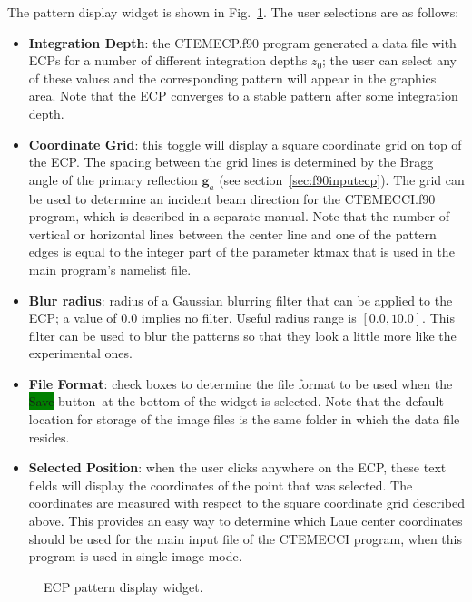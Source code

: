 \documentclass[DIV=calc, paper=letter, fontsize=11pt]{scrartcl}	 %
\newcommand{\button}[1]{\colorbox{green}{\textsf{#1}} button}
\begin{document}
The pattern display widget is shown in Fig.~\ref{fig:widget2}.  The user selections are as follows:
\begin{itemize}
	\item \textbf{Integration Depth}: the \textsf{CTEMECP.f90} program generated a data file with ECPs for a number of different
	integration depths $z_0$; the user can select any of these values and the corresponding pattern will appear in the graphics area.
	Note that the ECP converges to a stable pattern after some integration depth.
	\item \textbf{Coordinate Grid}: this toggle will display a square coordinate grid on top of the ECP.  The spacing between the 
	grid lines is determined by the Bragg angle of the primary reflection $\mathbf{g}_a$ (see section~\ref{sec:f90inputecp}).  The grid
	can be used to determine an incident beam direction for the \textsf{CTEMECCI.f90} program, which is described in a separate manual.
	Note that the number of vertical or horizontal lines between the center line and one of the pattern edges is equal to the 
	integer part of the parameter \textsf{ktmax} that is used in the main program's namelist file.
	\item \textbf{Blur radius}: radius of a Gaussian blurring filter that can be applied to the ECP; a value of $0.0$ implies no
	filter.  Useful radius range is $[0.0,10.0]$.  This filter can be used to blur the patterns so that they look a little more 
	like the experimental ones.
	\item \textbf{File Format}: check boxes to determine the file format to be used when the \button{Save}\ at the bottom of the widget
	is selected.  Note that the default location for storage of the image files is the same folder in which the data file resides. 
	\item \textbf{Selected Position}: when the user clicks anywhere on the ECP, these text fields will display the coordinates of the point 
	that was selected.  The coordinates are measured with respect to the square coordinate grid described above.  This provides an easy
	way to determine which Laue center coordinates should be used for the main input file of the \textsf{CTEMECCI} program, when this
	program is used in single image mode.
\end{itemize}

\begin{figure}[h]
\leavevmode\centering
\epsfxsize=2.75in
\caption{\label{fig:widget2}ECP pattern display widget.}
\end{figure}
\end{document}
